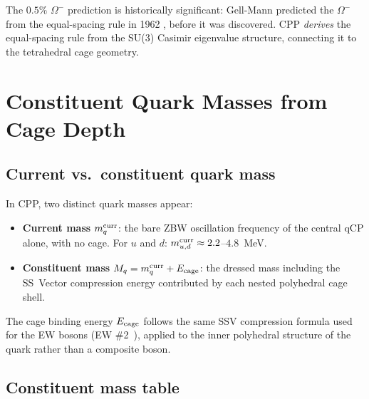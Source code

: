 \documentclass[11pt,a4paper]{article}
\begin{document}
The $0.5\%$ $\Omega^-$ prediction is historically significant:
Gell-Mann predicted the $\Omega^-$ from the equal-spacing rule in
1962 \citep{gell-mann1962a}, before it was discovered.  CPP
\emph{derives} the equal-spacing rule from the SU(3) Casimir
eigenvalue structure, connecting it to the tetrahedral cage
geometry.

\section{Constituent Quark Masses from Cage Depth}
\label{sec:mqconst}

\subsection{Current vs.\ constituent quark mass}

In CPP, two distinct quark masses appear:
\begin{itemize}
\item \textbf{Current mass} $m_q^{\rm curr}$: the bare ZBW
  oscillation frequency of the central qCP alone, with no cage.
  For $u$ and $d$: $m_{u,d}^{\rm curr} \approx 2.2$--$4.8$~MeV.
\item \textbf{Constituent mass} $M_q = m_q^{\rm curr} + E_{\rm cage}$:
  the dressed mass including the SS~Vector compression energy
  contributed by each nested polyhedral cage shell.
\end{itemize}

The cage binding energy $E_{\rm cage}$ follows the same SSV
compression formula used for the EW bosons (EW \#2~\citep{cpp_ew2}),
applied to the inner polyhedral structure of the quark rather than
a composite boson.

\subsection{Constituent mass table}
\end{document}
